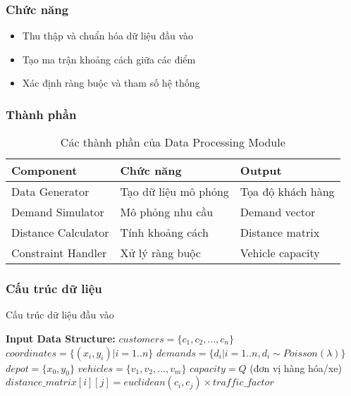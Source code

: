 \documentclass[12pt,a4paper]{article}
\begin{document}
\subsubsection{Chức năng}
\begin{itemize}
    \item Thu thập và chuẩn hóa dữ liệu đầu vào
    \item Tạo ma trận khoảng cách giữa các điểm
    \item Xác định ràng buộc và tham số hệ thống
\end{itemize}

\subsubsection{Thành phần}

\begin{table}[h]
\centering
\begin{tabular}{@{}lll@{}}
\toprule
\textbf{Component} & \textbf{Chức năng} & \textbf{Output} \\ \midrule
Data Generator & Tạo dữ liệu mô phỏng & Tọa độ khách hàng \\
Demand Simulator & Mô phỏng nhu cầu & Demand vector \\
Distance Calculator & Tính khoảng cách & Distance matrix \\
Constraint Handler & Xử lý ràng buộc & Vehicle capacity \\ \bottomrule
\end{tabular}
\caption{Các thành phần của Data Processing Module}
\end{table}

\subsubsection{Cấu trúc dữ liệu}

\begin{algorithm}
\caption{Cấu trúc dữ liệu đầu vào}
\begin{algorithmic}[1]
\State \textbf{Input Data Structure:}
\State \hspace{0.5cm} $customers = \{c_1, c_2, ..., c_n\}$
\State \hspace{0.5cm} $coordinates = \{(x_i, y_i) | i = 1..n\}$
\State \hspace{0.5cm} $demands = \{d_i | i = 1..n, d_i \sim Poisson(\lambda)\}$
\State \hspace{0.5cm} $depot = \{x_0, y_0\}$
\State \hspace{0.5cm} $vehicles = \{v_1, v_2, ..., v_m\}$
\State \hspace{0.5cm} $capacity = Q$ (đơn vị hàng hóa/xe)
\State \hspace{0.5cm} $distance\_matrix[i][j] = euclidean(c_i, c_j) \times traffic\_factor$
\end{algorithmic}
\end{algorithm}
\end{document}

